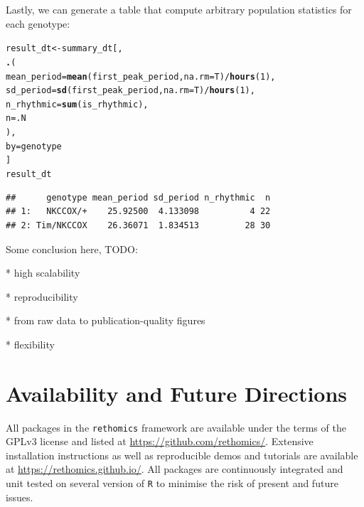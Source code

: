\documentclass[10pt,letterpaper]{article}\usepackage[]{graphicx}\usepackage[]{color}
\makeatletter
\newcommand{\hlnum}[1]{\textcolor[rgb]{0.686,0.059,0.569}{#1}}%
\newcommand{\hlopt}[1]{\textcolor[rgb]{0,0,0}{#1}}%
\newcommand{\hlstd}[1]{\textcolor[rgb]{0.345,0.345,0.345}{#1}}%
\newcommand{\hlkwb}[1]{\textcolor[rgb]{0.69,0.353,0.396}{#1}}%
\newcommand{\hlkwc}[1]{\textcolor[rgb]{0.333,0.667,0.333}{#1}}%
\newcommand{\hlkwd}[1]{\textcolor[rgb]{0.737,0.353,0.396}{\textbf{#1}}}%
\newenvironment{kframe}{%
 \def\at@end@of@kframe{}%
 \ifinner\ifhmode%
  \def\at@end@of@kframe{\end{minipage}}%
  \begin{minipage}{\columnwidth}%
 \fi\fi%
 \def\FrameCommand##1{\hskip\@totalleftmargin \hskip-\fboxsep
 \colorbox{shadecolor}{##1}\hskip-\fboxsep
     \hskip-\linewidth \hskip-\@totalleftmargin \hskip\columnwidth}%
 \MakeFramed {\advance\hsize-\width
   \@totalleftmargin\z@ \linewidth\hsize
   \@setminipage}}%
 {\par\unskip\endMakeFramed%
 \at@end@of@kframe}
\newenvironment{knitrout}{}{} %
\makeatother
\begin{document}
Lastly, we can generate a table that compute arbitrary population statistics for each genotype:
\begin{knitrout}
\color{fgcolor}\begin{kframe}
\begin{alltt}
\hlstd{result_dt} \hlkwb{<-} \hlstd{summary_dt[,}
          \hlkwd{.}\hlstd{(}
            \hlkwc{mean_period} \hlstd{=} \hlkwd{mean}\hlstd{(first_peak_period,} \hlkwc{na.rm} \hlstd{= T)} \hlopt{/} \hlkwd{hours}\hlstd{(}\hlnum{1}\hlstd{),}
            \hlkwc{sd_period} \hlstd{=} \hlkwd{sd}\hlstd{(first_peak_period,} \hlkwc{na.rm} \hlstd{= T)} \hlopt{/} \hlkwd{hours}\hlstd{(}\hlnum{1}\hlstd{),}
            \hlkwc{n_rhythmic} \hlstd{=} \hlkwd{sum}\hlstd{(is_rhythmic),}
            \hlkwc{n} \hlstd{= .N}
            \hlstd{),}
          \hlkwc{by} \hlstd{= genotype}
          \hlstd{]}
\hlstd{result_dt}
\end{alltt}
\begin{verbatim}
##      genotype mean_period sd_period n_rhythmic  n
## 1:   NKCCOX/+    25.92500  4.133098          4 22
## 2: Tim/NKCCOX    26.36071  1.834513         28 30
\end{verbatim}
\end{kframe}
\end{knitrout}


Some conclusion here, TODO:

* high scalability

* reproducibility

* from raw data to publication-quality figures

* flexibility




% 

\section*{Availability and Future Directions}
All packages in the \texttt{rethomics} framework are available under the terms of the GPLv3 license and listed at
\href{https://github.com/rethomics}{https://github.com/rethomics/}.
Extensive installation instructions as well as reproducible demos and tutorials are available at
\href{https://rethomics.github.io/}{https://rethomics.github.io/}.
All packages are continuously integrated and unit tested on several version of \texttt{R} to minimise the risk of present and future issues.
\end{document}
